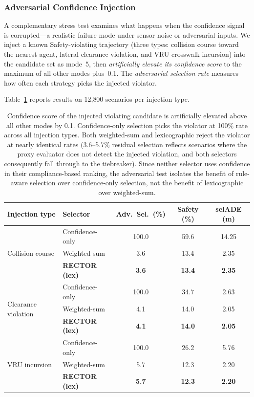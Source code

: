 \subsubsection{Adversarial Confidence Injection}
\label{subsubsec:adversarial}

A complementary stress test examines what happens when the confidence signal is corrupted---a realistic failure mode under sensor noise or adversarial inputs.  We inject a known Safety-violating trajectory (three types: collision course toward the nearest agent, lateral clearance violation, and VRU crosswalk incursion) into the candidate set as mode~5, then \emph{artificially elevate its confidence score} to the maximum of all other modes plus~0.1.  The \emph{adversarial selection rate} measures how often each strategy picks the injected violator.

Table~\ref{tab:adversarial_injection} reports results on 12{,}800 scenarios per injection type.

\begin{table}[t]
\centering
\caption{Adversarial Confidence Injection: Selection Rate for Injected Violator}
\label{tab:adversarial_injection}
\setlength{\tabcolsep}{3pt}
\begin{tabular}{llccc}
\toprule
\textbf{Injection type} & \textbf{Selector} & \textbf{Adv.\ Sel.\ (\%)} & \textbf{Safety (\%)} & \textbf{selADE (m)} \\
\midrule
\multirow{3}{*}{Collision course}
  & Confidence-only & 100.0 & 59.6 & 14.25 \\
  & Weighted-sum    &   3.6 & 13.4 &  2.35 \\
  & \textbf{RECTOR (lex)} & \textbf{3.6} & \textbf{13.4} & \textbf{2.35} \\
\midrule
\multirow{3}{*}{Clearance violation}
  & Confidence-only & 100.0 & 34.7 &  2.63 \\
  & Weighted-sum    &   4.1 & 14.0 &  2.05 \\
  & \textbf{RECTOR (lex)} & \textbf{4.1} & \textbf{14.0} & \textbf{2.05} \\
\midrule
\multirow{3}{*}{VRU incursion}
  & Confidence-only & 100.0 & 26.2 &  5.76 \\
  & Weighted-sum    &   5.7 & 12.3 &  2.20 \\
  & \textbf{RECTOR (lex)} & \textbf{5.7} & \textbf{12.3} & \textbf{2.20} \\
\bottomrule
\end{tabular}
\vspace{1mm}
\caption*{\footnotesize Confidence score of the injected violating candidate is artificially elevated above all other modes by 0.1.  Confidence-only selection picks the violator at 100\% rate across all injection types.  Both weighted-sum and lexicographic reject the violator at nearly identical rates (3.6--5.7\% residual selection reflects scenarios where the proxy evaluator does not detect the injected violation, and both selectors consequently fall through to the tiebreaker).  Since neither selector uses confidence in their compliance-based ranking, the adversarial test isolates the benefit of rule-aware selection over confidence-only selection, not the benefit of lexicographic over weighted-sum.}
\end{table}


